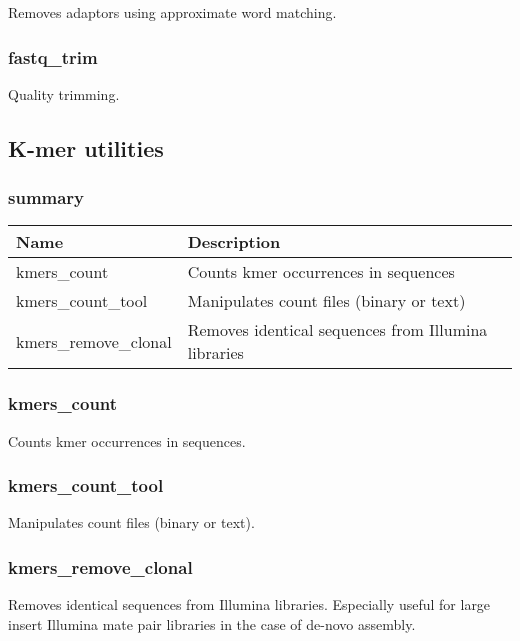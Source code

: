 \documentclass[a4paper,12pt]{article}
\begin{document}
Removes adaptors using approximate word matching.

\subsubsection{fastq\_trim}

Quality trimming.


\subsection{K-mer utilities}

\subsubsection{summary}

\begin{tabularx}{\textwidth}{|X|X|}
    \hline
    \textbf{Name}                   & \textbf{Description} \\
    \hline
    \hline
    kmers\_count                    & Counts kmer occurrences in sequences \\
    kmers\_count\_tool              & Manipulates count files (binary or text) \\
    kmers\_remove\_clonal           & Removes identical sequences from Illumina libraries \\
    \hline
\end{tabularx}

\subsubsection{kmers\_count}

Counts kmer occurrences in sequences.

\subsubsection{kmers\_count\_tool}

Manipulates count files (binary or text).

\subsubsection{kmers\_remove\_clonal}

Removes identical sequences from Illumina libraries.
Especially useful for large insert Illumina mate pair libraries in the case of
de-novo assembly.
\end{document}

